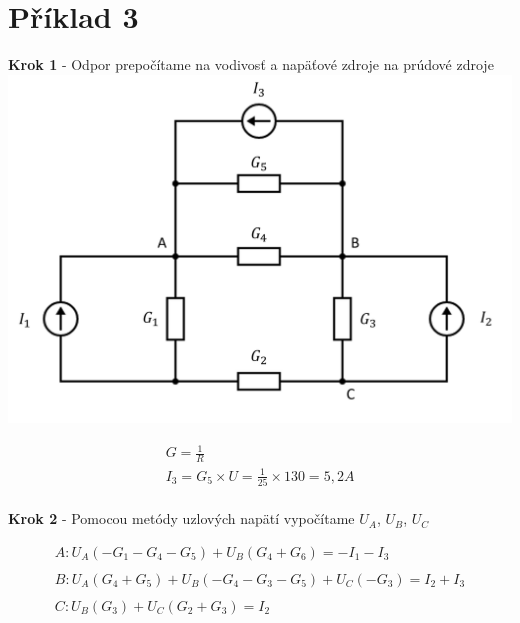 \section{Příklad 3}

\begin{center}
    \textbf{Krok 1} - Odpor prepočítame na vodivosť a napäťové zdroje na prúdové zdroje
    \includegraphics[scale=0.5,keepaspectratio]{fig/pr3_1.png} \\
\end{center}

\begin{gather*}
    G = \frac {1} {R} \\
    I_3 = G_5 \times U = \frac {1} {25} \times 130 = 5,2 A \\
\end{gather*}

\newpage

\begin{center}
    \textbf{Krok 2} - Pomocou metódy uzlových napätí vypočítame $U_{A}$, $U_{B}$, $U_{C}$ 
\end{center}

\begin{gather*}
   A:  U_A(-G_1 - G_4 - G_5) + U_B(G_4 + G_6) = -I_1 - I_3 \\\\
   B:  U_A(G_4 + G_5) + U_B(-G_4 - G_3 - G_5) + U_C(-G_3) = I_2 + I_3 \\\\
   C:  U_B(G_3) + U_C(G_2 + G_3) = I_2 \\
\end{gather*}


